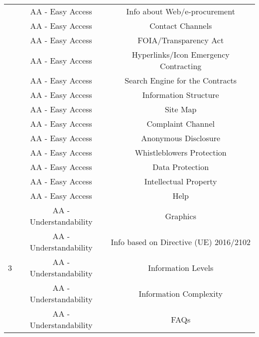 \documentclass[a4paper, twoside]{report}
\begin{document}
\begin{table}[htbp]
\begin{adjustbox}{max width=\linewidth}
\begin{tabular}{ccc}
          & AA - Easy Access & Info about Web/e-procurement \\
          & AA - Easy Access & Contact Channels \\
          & AA - Easy Access & FOIA/Transparency Act \\
          & \cellcolor[rgb]{ .851,  .851,  .851}AA - Easy Access & \cellcolor[rgb]{ .851,  .851,  .851}Hyperlinks/Icon Emergency Contracting \\
          & AA - Easy Access & Search Engine for the Contracts \\
          & AA - Easy Access & Information Structure \\
          & AA - Easy Access & Site Map \\
          & AA - Easy Access & Complaint Channel \\
          & \cellcolor[rgb]{ .851,  .851,  .851}AA - Easy Access & \cellcolor[rgb]{ .851,  .851,  .851}Anonymous Disclosure \\
          & AA - Easy Access & Whistleblowers Protection \\
          & AA - Easy Access & Data Protection \\
          & AA - Easy Access & Intellectual Property \\
          & AA - Easy Access & Help \\
    \midrule
    \multirow{5}[2]{*}{3} & AA - Understandability & Graphics \\
          & AA - Understandability & Info based on Directive (UE) 2016/2102 \\
          & \cellcolor[rgb]{ .851,  .851,  .851}AA - Understandability & \cellcolor[rgb]{ .851,  .851,  .851}Information Levels \\
          & \cellcolor[rgb]{ .851,  .851,  .851}AA - Understandability & \cellcolor[rgb]{ .851,  .851,  .851}Information Complexity \\
          & \cellcolor[rgb]{ .851,  .851,  .851}AA - Understandability & \cellcolor[rgb]{ .851,  .851,  .851}FAQs \\
    \bottomrule
    \end{tabular}%
    \end{adjustbox}
  \label{tab:core_index_disaggregation1}%
\end{table}%
  
\end{document}
